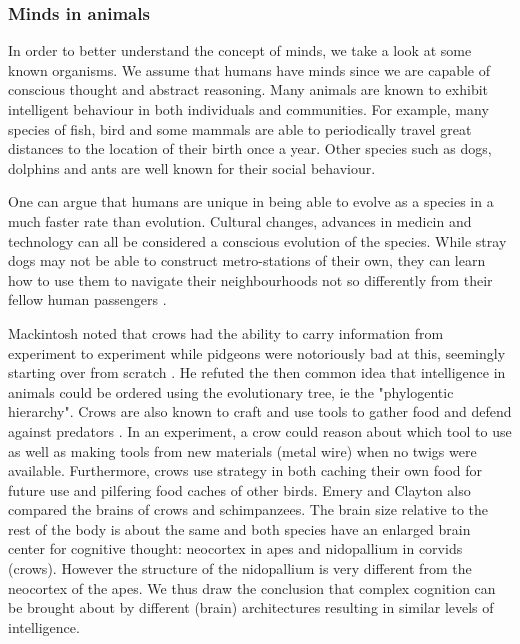 \documentclass[11pt]{article}
\newenvironment{draft}{\color{dark-cornflower-blue-2}}{\ignorespacesafterend}
\begin{document}
\subsubsection*{Minds in animals}


\begin{draft}

In order to better understand the concept of minds, we take a look at some known organisms. We assume that humans have minds since we are capable of conscious thought and abstract reasoning. Many animals are known to exhibit intelligent behaviour in both individuals and communities. For example, many species of fish, bird and some mammals are able to periodically travel great distances to the location of their birth once a year. Other species such as dogs, dolphins and ants are well known for their social behaviour.

One can argue that humans are unique in being able to evolve as a species in a much faster rate than evolution. Cultural changes, advances in medicin and technology can all be considered a conscious evolution of the species. While stray dogs may not be able to construct metro-stations of their own, they can learn how to use them to navigate their neighbourhoods not so differently from their fellow human passengers \cite{moskowDogs}.

Mackintosh noted that crows had the ability to carry information from experiment to experiment while pidgeons were notoriously bad at this, seemingly starting over from scratch \cite{mackintosh1988animals}. He refuted the then common idea that intelligence in animals could be ordered using the evolutionary tree, ie the "phylogentic hierarchy". 
Crows are also known to craft and use tools to gather food and defend against predators \cite{emery2004crows}. In an experiment, a crow could reason about which tool to use as well as making tools from new materials (metal wire) when no twigs were available.
Furthermore, crows use strategy in both caching their own food for future use and pilfering food caches of other birds. 
Emery and Clayton also compared the brains of crows and schimpanzees.
The brain size relative to the rest of the body is about the same and both species have an enlarged brain center for cognitive thought: neocortex in apes and nidopallium in corvids (crows). However the structure of the nidopallium is very different from the neocortex of the apes. We thus draw the conclusion that complex cognition can be brought about by different (brain) architectures resulting in similar levels of intelligence.

\end{draft}
\end{document}

